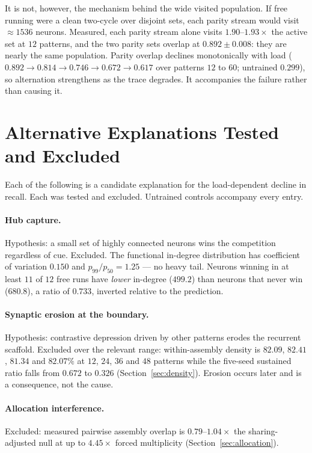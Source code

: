 \documentclass[10pt,twocolumn,a4paper]{article}
\newcommand{\pct}{\%}
\begin{document}
It is not, however, the mechanism behind the wide visited population. If free running were
a clean two-cycle over disjoint sets, each parity stream would visit $\approx 1536$
neurons. Measured, each parity stream alone visits $1.90$--$1.93\times$ the active set at
$12$ patterns, and the two parity sets overlap at $0.892 \pm 0.008$: they are nearly the
same population. Parity overlap declines monotonically with load
($0.892 \to 0.814 \to 0.746 \to 0.672 \to 0.617$ over patterns $12$ to $60$; untrained
$0.299$), so alternation strengthens as the trace degrades. It accompanies the failure
rather than causing it.

\section{Alternative Explanations Tested and Excluded}
\label{sec:ruledout}

Each of the following is a candidate explanation for the load-dependent decline in recall.
Each was tested and excluded. Untrained controls accompany every entry.

\paragraph{Hub capture.}
Hypothesis: a small set of highly connected neurons wins the competition regardless of
cue. Excluded. The functional in-degree distribution has coefficient of variation $0.150$
and $p_{99}/p_{50} = 1.25$ --- no heavy tail. Neurons winning in at least $11$ of $12$
free runs have \emph{lower} in-degree ($499.2$) than neurons that never win ($680.8$), a
ratio of $0.733$, inverted relative to the prediction.

\paragraph{Synaptic erosion at the boundary.}
Hypothesis: contrastive depression driven by other patterns erodes the recurrent scaffold.
Excluded over the relevant range: within-assembly density is $82.09$, $82.41$, $81.34$ and
$82.07\pct$ at $12$, $24$, $36$ and $48$ patterns while the five-seed sustained ratio falls
from $0.672$ to $0.326$ (Section~\ref{sec:density}). Erosion occurs later and is a
consequence, not the cause.

\paragraph{Allocation interference.}
Excluded: measured pairwise assembly overlap is $0.79$--$1.04\times$ the sharing-adjusted
null at up to $4.45\times$ forced multiplicity (Section~\ref{sec:allocation}).
\end{document}
